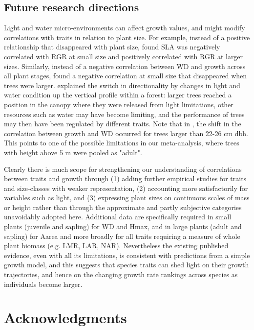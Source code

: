 \documentclass[a4paper]{article}\usepackage[]{graphicx}\usepackage[]{color}
\begin{document}
\subsection*{Future research directions}

Light and water micro-environments can affect growth values, and might modify correlations with traits in relation to plant size. For example, instead of a positive relationship that disappeared with plant size, \citet{Iida:2014ep} found SLA was negatively correlated with RGR at small size and positively correlated with RGR at larger sizes. Similarly, instead of a negative correlation between WD and growth across all plant stages, \citep{Iida:2014ep,Iida:2014hq} found a negative correlation at small size that disappeared when trees were larger. \citet{Iida:2014hq} explained the switch in directionality by changes in light and water condition up the vertical profile within a forest: larger trees reached a position in the canopy where they were released from light limitations, other resources such as water may have become limiting, and the performance of trees may then have been regulated by different traits. Note that in \citet{Iida:2014hq}, the shift in the correlation between growth and WD occurred for trees larger than 22-26 cm dbh. This points to one of the possible limitations in our meta-analysis, where trees with height above 5 m were pooled as "adult". 

Clearly there is much scope for strengthening our understanding of correlations between traits and growth through (1) adding further empirical studies for traits and size-classes with weaker representation, (2) accounting more satisfactorily for variables such as light, and (3) expressing plant sizes on continuous scales of mass or height rather than through the approximate and partly subjective categories unavoidably adopted here. Additional data are specifically required in small plants (juvenile and sapling) for WD and Hmax, and in large plants (adult and sapling) for Aarea and more broadly for all traits requiring a measure of whole plant biomass (e.g. LMR, LAR, NAR). Nevertheless the existing published evidence, even with all its limitations, is consistent with predictions from a simple growth model, and this suggests that species traits can shed light on their growth trajectories, and hence on the changing growth rate rankings across species as individuals become larger. 

\section*{Acknowledgments}\label{Acknowledgment}
\end{document}
